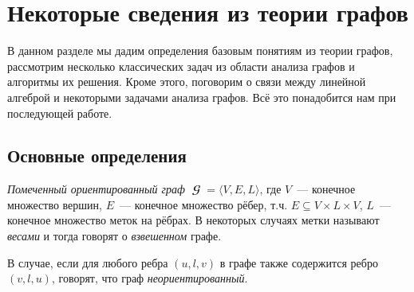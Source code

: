 \setchapterpreamble[u]{\margintoc}
\chapter{Некоторые сведения из теории графов}
\label{chpt:GraphTheoryIntro}

В данном разделе мы дадим определения базовым понятиям из теории графов, рассмотрим несколько классических задач из области анализа графов и алгоритмы их решения.
Кроме этого, поговорим о связи между линейной алгеброй и некоторыми задачами анализа графов.
Всё это понадобится нам при последующей работе.

\section{Основные определения}

\begin{definition}
    \emph{Помеченный ориентированный граф} $\mbfscrG = \langle V, E, L \rangle$, где $V$~--- конечное множество вершин, $E$~--- конечное множество рёбер, т.ч. $E \subseteq V \times L \times V$, $L$~--- конечное множество меток на рёбрах.
    В некоторых случаях метки называют \emph{весами}%
    и тогда говорят о \emph{взвешенном} графе.
\end{definition}

\begin{definition}
    В случае, если для любого ребра $(u, l, v)$ в графе также содержится ребро $(v, l, u)$, говорят, что граф \emph{неориентированный}.
\end{definition}

